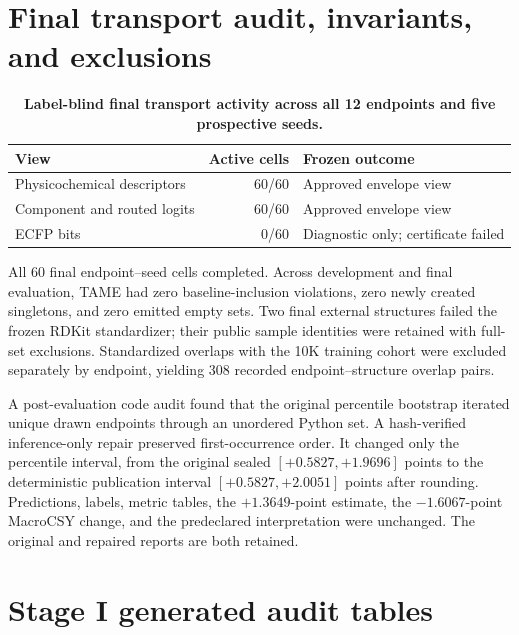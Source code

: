 \documentclass[10pt]{article}
\begin{document}
\section{Final transport audit, invariants, and exclusions}

\begin{table}[!htbp]
\centering
\caption{\textbf{Label-blind final transport activity across all 12 endpoints and five prospective seeds.}}
\small
\begin{tabular}{lrl}
\toprule
View & Active cells & Frozen outcome \\
\midrule
Physicochemical descriptors & 60/60 & Approved envelope view \\
Component and routed logits & 60/60 & Approved envelope view \\
ECFP bits & 0/60 & Diagnostic only; certificate failed \\
\bottomrule
\end{tabular}
\end{table}

All 60 final endpoint--seed cells completed. Across development and final evaluation, TAME had zero baseline-inclusion violations, zero newly created singletons, and zero emitted empty sets. Two final external structures failed the frozen RDKit standardizer; their public sample identities were retained with full-set exclusions. Standardized overlaps with the 10K training cohort were excluded separately by endpoint, yielding 308 recorded endpoint--structure overlap pairs.

A post-evaluation code audit found that the original percentile bootstrap iterated unique drawn endpoints through an unordered Python set. A hash-verified inference-only repair preserved first-occurrence order. It changed only the percentile interval, from the original sealed $[+0.5827,+1.9696]$ points to the deterministic publication interval $[+0.5827,+2.0051]$ points after rounding. Predictions, labels, metric tables, the $+1.3649$-point estimate, the $-1.6067$-point MacroCSY change, and the predeclared interpretation were unchanged. The original and repaired reports are both retained.

\section{Stage I generated audit tables}

\end{document}
